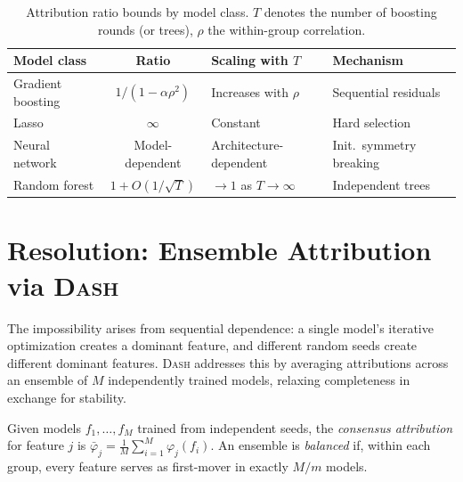 \documentclass{jmlr}
\newcommand{\DASH}{\textsc{Dash}}
\begin{document}
\begin{table}[t]
\centering
\caption{Attribution ratio bounds by model class. $T$ denotes the number of boosting rounds (or trees), $\rho$ the within-group correlation.}
\label{tab:model-comparison}
\small
\begin{tabular}{@{}lcll@{}}
\toprule
Model class & Ratio & Scaling with $T$ & Mechanism \\
\midrule
Gradient boosting & $1/(1-\alpha\rho^2)$ & Increases with $\rho$ & Sequential residuals \\
Lasso & $\infty$ & Constant & Hard selection \\
Neural network & Model-dependent & Architecture-dependent & Init.\ symmetry breaking \\
Random forest\footnotemark & $1 + O(1/\sqrt{T})$ & $\to 1$ as $T \to \infty$ & Independent trees \\
\bottomrule
\end{tabular}
\end{table}


\section{Resolution: Ensemble Attribution via \DASH}
\label{sec:resolution}

The impossibility arises from sequential dependence: a single model's iterative optimization creates a dominant feature, and different random seeds create different dominant features.
\DASH{} addresses this by averaging attributions across an ensemble of $M$ independently trained models, relaxing completeness in exchange for stability.

\begin{definition}[\DASH{} consensus attribution]
\label{def:dash}
Given models $f_1, \ldots, f_M$ trained from independent seeds, the \emph{consensus attribution} for feature $j$ is $\bar{\varphi}_j = \frac{1}{M} \sum_{i=1}^{M} \varphi_j(f_i)$.
An ensemble is \emph{balanced} if, within each group, every feature serves as first-mover in exactly $M/m$ models.
\end{definition}
\end{document}
